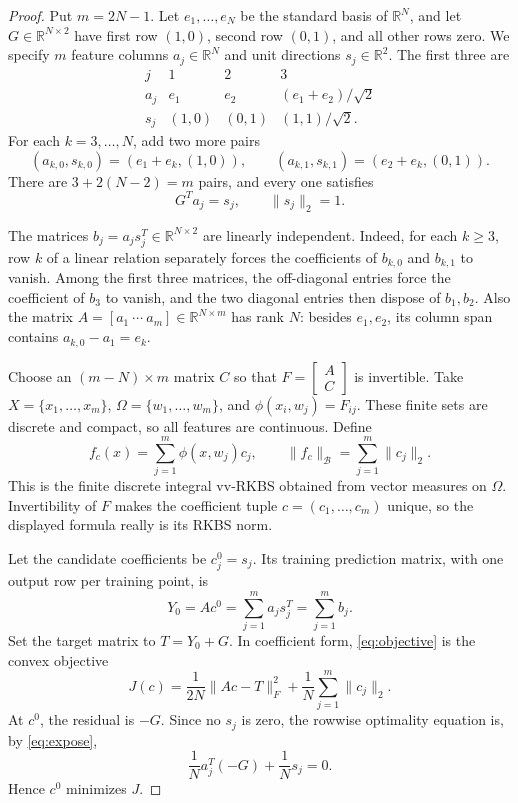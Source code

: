 \documentclass[11pt]{article}
\newcommand{\R}{\mathbb R}
\newcommand{\B}{\mathcal B}
\begin{document}
\begin{proof}
Put \(m=2N-1\).  Let \(e_1,\ldots,e_N\) be the standard basis of \(\R^N\),
and let \(G\in\R^{N\times2}\) have first row \((1,0)\), second row
\((0,1)\), and all other rows zero.  We specify \(m\) feature columns
\(a_j\in\R^N\) and unit directions \(s_j\in\R^2\).  The first three are
\[
 \begin{array}{c|ccc}
 j&1&2&3\\ \hline
 a_j&e_1&e_2&(e_1+e_2)/\sqrt2\\
 s_j&(1,0)&(0,1)&(1,1)/\sqrt2 .
 \end{array}
\]
For each \(k=3,\ldots,N\), add two more pairs
\[
 (a_{k,0},s_{k,0})=(e_1+e_k,(1,0)),\qquad
 (a_{k,1},s_{k,1})=(e_2+e_k,(0,1)).
\]
There are \(3+2(N-2)=m\) pairs, and every one satisfies
\begin{equation}\label{eq:expose}
 G^Ta_j=s_j,\qquad \|s_j\|_2=1.
\end{equation}

The matrices \(b_j=a_js_j^T\in\R^{N\times2}\) are linearly independent.
Indeed, for each \(k\ge3\), row \(k\) of a linear relation separately forces
the coefficients of \(b_{k,0}\) and \(b_{k,1}\) to vanish.  Among the first
three matrices, the off-diagonal entries force the coefficient of \(b_3\)
to vanish, and the two diagonal entries then dispose of \(b_1,b_2\).
Also the matrix \(A=[a_1\ \cdots\ a_m]\in\R^{N\times m}\) has rank \(N\):
besides \(e_1,e_2\), its column span contains
\(a_{k,0}-a_1=e_k\).

Choose an \((m-N)\times m\) matrix \(C\) so that
\(F=\begin{bmatrix}A\\C\end{bmatrix}\) is invertible.  Take
\(X=\{x_1,\ldots,x_m\}\),
\(\Omega=\{w_1,\ldots,w_m\}\), and
\(\phi(x_i,w_j)=F_{ij}\).  These finite sets are discrete and compact, so
all features are continuous.  Define
\[
 f_c(x)=\sum_{j=1}^m\phi(x,w_j)c_j,
 \qquad
 \|f_c\|_{\B}=\sum_{j=1}^m\|c_j\|_2 .
\]
This is the finite discrete integral vv-RKBS obtained from vector measures on
\(\Omega\).  Invertibility of \(F\) makes the coefficient tuple
\(c=(c_1,\ldots,c_m)\) unique, so the displayed formula really is its RKBS
norm.

Let the candidate coefficients be \(c_j^0=s_j\).  Its training prediction
matrix, with one output row per training point, is
\[
 Y_0=Ac^0=\sum_{j=1}^m a_js_j^T=\sum_{j=1}^m b_j.
\]
Set the target matrix to \(T=Y_0+G\).  In coefficient form,
\eqref{eq:objective} is the convex objective
\begin{equation}\label{eq:finite-objective}
 J(c)=\frac1{2N}\|Ac-T\|_F^2
      +\frac1N\sum_{j=1}^m\|c_j\|_2.
\end{equation}
At \(c^0\), the residual is \(-G\).  Since no \(s_j\) is zero, the rowwise
optimality equation is, by \eqref{eq:expose},
\[
 \frac1N a_j^T(-G)+\frac1N s_j=0.
\]
Hence \(c^0\) minimizes \(J\).


\end{proof}
\end{document}
